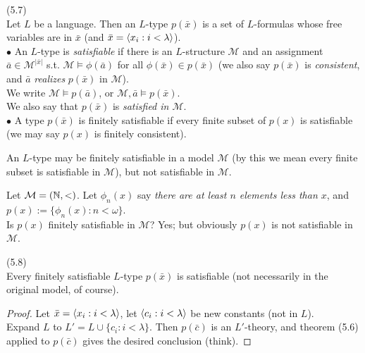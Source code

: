 \documentclass[a4paper]{article}
\begin{document}
\begin{defi} (5.7)\\
    Let $L$ be a language. Then an $L$-type $p(\bar{x})$ is a set of $L$-formulas whose free variables are in $\bar{x}$ (and $\bar{x} = \langle x_i : i < \lambda \rangle $).\\
    $\bullet$ An $L$-type is \emph{satisfiable} if there is an $L$-structure $\mathcal{M}$ and an assignment $\bar{a} \in \mathcal{M}^{|\bar{x}|}$ s.t. $\mathcal{M} \vDash \phi(\bar{a})$ for all $\phi(\bar{x}) \in p(\bar{x})$ (we also say $p(\bar{x})$ is \emph{consistent}, and $\bar{a}$ \emph{realizes} $p(\bar{x})$ in $\mathcal{M}$).\\
    We write $\mathcal{M} \vDash p(\bar{a})$, or $\mathcal{M},\bar{a} \vDash p(\bar{x})$.\\
    We also say that $p(\bar{x})$ is \emph{satisfied in $\mathcal{M}$}.\\
    $\bullet$ A type $p(\bar{x})$ is finitely satisfiable if every finite subset of $p(x)$ is satisfiable (we may say $p(x)$ is finitely consistent).
\end{defi}

\begin{rem}
    An $L$-type may be finitely satisfiable in a model $\mathcal{M}$ (by this we mean every finite subset is satisfiable in $\mathcal{M}$), but not satisfiable in $\mathcal{M}$.
\end{rem}

\begin{eg}
    Let $\mathcal{M} = (\mathbb{N},<)$. Let $\phi_n(x)$ say \emph{there are at least $n$ elements less than $x$}, and $p(x):=\{\phi_n(x):n < \omega\}$.\\
    Is $p(x)$ finitely satisfiable in $\mathcal{M}$? Yes; but obviously $p(x)$ is not satisfiable in $\mathcal{M}$.
\end{eg}

\begin{thm} (5.8)\\
    Every finitely satisfiable $L$-type $p(\bar{x})$ is satisfiable (not necessarily in the original model, of course).
    \begin{proof}
        Let $\bar{x} = \langle x_i : i<\lambda\rangle$, let $\langle c_i:i<\lambda\rangle$ be new constants (not in $L$).\\
        Expand $L$ to $L' = L \cup \{c_i:i<\lambda\}$. Then $p(\bar{c})$ is an $L'$-theory, and theorem (5.6) applied to $p(\bar{c})$ gives the desired conclusion (think).
    \end{proof}
\end{thm}
\end{document}
